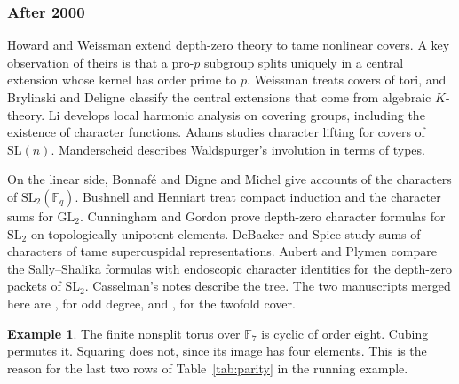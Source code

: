 \documentclass[12pt,letterpaper]{article}
\numberwithin{equation}{section}
\theoremstyle{definition}
\newtheorem{example}[theorem]{Example}
\theoremstyle{remark}
\newcommand{\kk}{\mathbb F_q}
\begin{document}
\subsubsection*{After 2000}
Howard and Weissman \cite{HW09} extend depth-zero theory to tame nonlinear covers. A key observation of theirs is that a pro-$p$ subgroup splits uniquely in a central extension whose kernel has order prime to $p$. Weissman \cite{We09} treats covers of tori, and Brylinski and Deligne \cite{BD01} classify the central extensions that come from algebraic $K$-theory. Li \cite{Li12} develops local harmonic analysis on covering groups, including the existence of character functions. Adams \cite{Ad03} studies character lifting for covers of $\mathrm{SL}(n)$. Manderscheid \cite{Ma04} describes Waldspurger's involution in terms of types.

On the linear side, Bonnaf\'e \cite{Bo11} and Digne and Michel \cite{DM20} give accounts of the characters of $\mathrm{SL}_2(\kk)$. Bushnell and Henniart \cite{BH06} treat compact induction and the character sums for $\mathrm{GL}_2$. Cunningham and Gordon \cite{CG09} prove depth-zero character formulas for $\mathrm{SL}_2$ on topologically unipotent elements. DeBacker and Spice \cite{DS18} study sums of characters of tame supercuspidal representations. Aubert and Plymen \cite{AP24} compare the Sally--Shalika formulas with endoscopic character identities for the depth-zero packets of $\mathrm{SL}_2$. Casselman's notes \cite{Ca14} describe the tree. The two manuscripts merged here are \cite{Jo26a}, for odd degree, and \cite{Jo26b}, for the twofold cover.

\begin{example}
The finite nonsplit torus over $\mathbb F_7$ is cyclic of order eight. Cubing permutes it. Squaring does not, since its image has four elements. This is the reason for the last two rows of Table~\ref{tab:parity} in the running example.
\end{example}
\end{document}
